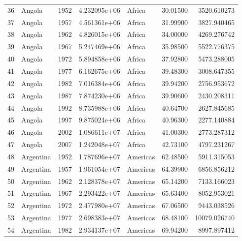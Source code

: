 \documentclass[
  letterpaper,
  DIV=11,
  numbers=noendperiod]{scrreprt}
\begin{document}
\begin{tabular}{llrrlrr}
36   &                    Angola &  1952 &  4.232095e+06 &    Africa &  30.01500 &    3520.610273 \\
37   &                    Angola &  1957 &  4.561361e+06 &    Africa &  31.99900 &    3827.940465 \\
38   &                    Angola &  1962 &  4.826015e+06 &    Africa &  34.00000 &    4269.276742 \\
39   &                    Angola &  1967 &  5.247469e+06 &    Africa &  35.98500 &    5522.776375 \\
40   &                    Angola &  1972 &  5.894858e+06 &    Africa &  37.92800 &    5473.288005 \\
41   &                    Angola &  1977 &  6.162675e+06 &    Africa &  39.48300 &    3008.647355 \\
42   &                    Angola &  1982 &  7.016384e+06 &    Africa &  39.94200 &    2756.953672 \\
43   &                    Angola &  1987 &  7.874230e+06 &    Africa &  39.90600 &    2430.208311 \\
44   &                    Angola &  1992 &  8.735988e+06 &    Africa &  40.64700 &    2627.845685 \\
45   &                    Angola &  1997 &  9.875024e+06 &    Africa &  40.96300 &    2277.140884 \\
46   &                    Angola &  2002 &  1.086611e+07 &    Africa &  41.00300 &    2773.287312 \\
47   &                    Angola &  2007 &  1.242048e+07 &    Africa &  42.73100 &    4797.231267 \\
48   &                 Argentina &  1952 &  1.787696e+07 &  Americas &  62.48500 &    5911.315053 \\
49   &                 Argentina &  1957 &  1.961054e+07 &  Americas &  64.39900 &    6856.856212 \\
50   &                 Argentina &  1962 &  2.128378e+07 &  Americas &  65.14200 &    7133.166023 \\
51   &                 Argentina &  1967 &  2.293422e+07 &  Americas &  65.63400 &    8052.953021 \\
52   &                 Argentina &  1972 &  2.477980e+07 &  Americas &  67.06500 &    9443.038526 \\
53   &                 Argentina &  1977 &  2.698383e+07 &  Americas &  68.48100 &   10079.026740 \\
54   &                 Argentina &  1982 &  2.934137e+07 &  Americas &  69.94200 &    8997.897412 \\

\end{tabular}
\end{document}
